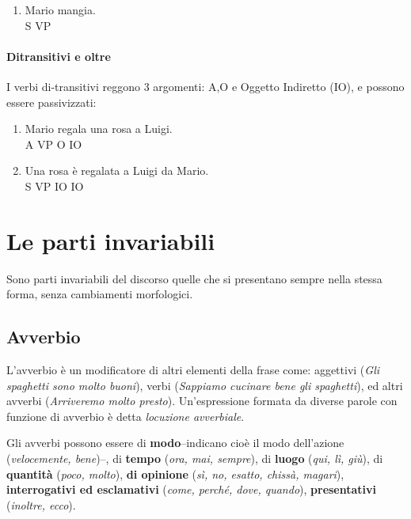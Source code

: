 \documentclass[a4paper,twoside,11pt,chapterprefix=false,bibliography=totocnumbered,listof=flat]{scrbook}
\providecommand{\tightlist}{%
  \setlength{\itemsep}{0pt}\setlength{\parskip}{0pt}}
\let\oldparagraph\paragraph
\renewcommand{\paragraph}[1]{\oldparagraph{#1}\mbox{}}
\begin{document}
\begin{enumerate}
\def\labelenumi{(\arabic{enumi})}
\setcounter{enumi}{3}
\tightlist
\item
  \gll    Mario mangia.\\
  S VP\\
  \glt  
\end{enumerate}

\hypertarget{ditransitivi-e-oltre}{%
\paragraph{Ditransitivi e oltre}\label{ditransitivi-e-oltre}}

I verbi di-transitivi reggono 3 argomenti: A,O e Oggetto Indiretto (IO),
e possono essere passivizzati:

\begin{enumerate}
\def\labelenumi{(\arabic{enumi})}
\setcounter{enumi}{4}
\item
  \gll    Mario regala una rosa a Luigi.\\
  A VP O IO\\
  \glt  
\item
  \gll    Una rosa è regalata a Luigi da Mario.\\
  S VP IO IO\\
  \glt  
\end{enumerate}

\hypertarget{le-parti-invariabili}{%
\section{Le parti invariabili}\label{le-parti-invariabili}}

Sono parti invariabili del discorso quelle che si presentano sempre
nella stessa forma, senza cambiamenti morfologici.

\hypertarget{avverbio}{%
\subsection{Avverbio}\label{avverbio}}

L'avverbio è un modificatore di altri elementi della frase come:
aggettivi (\emph{Gli spaghetti sono molto buoni}), verbi (\emph{Sappiamo
cucinare bene gli spaghetti}), ed altri avverbi (\emph{Arriveremo molto
presto}). Un'espressione formata da diverse parole con funzione di
avverbio è detta \emph{locuzione avverbiale}.

Gli avverbi possono essere di \textbf{modo}--indicano cioè il modo
dell'azione (\emph{velocemente, bene})--, di \textbf{tempo} (\emph{ora,
mai, sempre}), di \textbf{luogo} (\emph{qui, lì, giù}), di
\textbf{quantità} (\emph{poco, molto}), \textbf{di opinione} (\emph{sì,
no, esatto, chissà, magari}), \textbf{interrogativi ed esclamativi}
(\emph{come, perché, dove, quando}), \textbf{presentativi}
(\emph{inoltre, ecco}).
\end{document}
